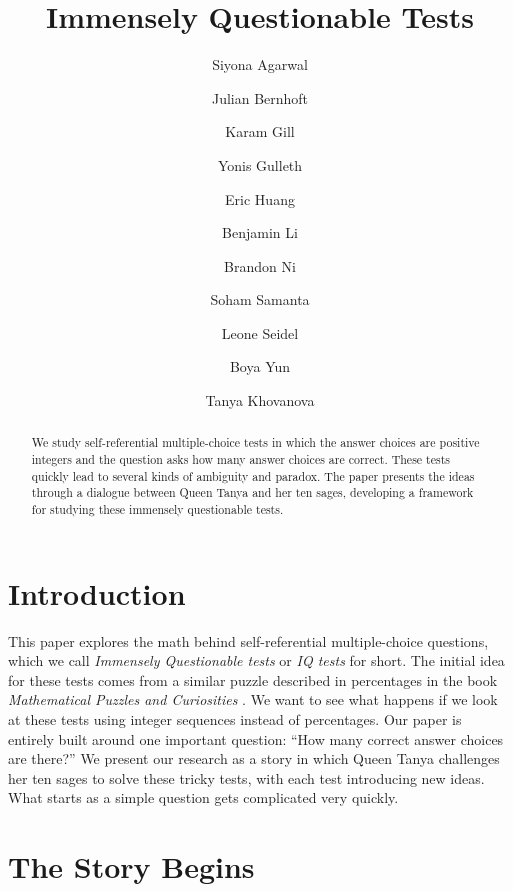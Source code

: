\documentclass[12pt,reqno]{article}
\theoremstyle{plain}
\theoremstyle{definition}
\theoremstyle{remark}
\begin{document}
\title{Immensely Questionable Tests}

\author{Siyona Agarwal}
\author{Julian Bernhoft}
\author{Karam Gill}
\author{Yonis Gulleth}
\author{Eric Huang}
\author{Benjamin Li}
\author{Brandon Ni}
\author{Soham Samanta}
\author{Leone Seidel}
\author{Boya Yun}
\author{Tanya Khovanova}

\maketitle

\begin{abstract}
We study self-referential multiple-choice tests in which the answer choices are positive integers and the question asks how many answer choices are correct. These tests quickly lead to several kinds of ambiguity and paradox. The paper presents the ideas through a dialogue between Queen Tanya and her ten sages, developing a framework for studying these immensely questionable tests.
\end{abstract}



\section{Introduction}

This paper explores the math behind self-referential multiple-choice questions, which we call \textit{Immensely Questionable tests} or \textit{IQ tests} for short. The initial idea for these tests comes from a similar puzzle described in percentages in the book \textit{Mathematical Puzzles and Curiosities} \cite{DKS}. We want to see what happens if we look at these tests using integer sequences instead of percentages. Our paper is entirely built around one important question: ``How many correct answer choices are there?'' We present our research as a story in which Queen Tanya challenges her ten sages to solve these tricky tests, with each test introducing new ideas. What starts as a simple question gets complicated very quickly. 

\section{The Story Begins}
\end{document}
